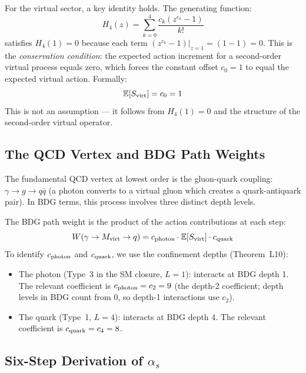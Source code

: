 \documentclass[12pt,a4paper]{article}
\begin{document}
For the virtual sector, a key identity holds.  The generating function:
\begin{equation}
  H_4(z) = \sum_{k=0}^{4}\frac{c_k(z^{c_k}-1)}{k!}
  \label{eq:H4}
\end{equation}
satisfies $H_4(1)=0$ because each term $(z^{c_k}-1)|_{z=1}=(1-1)=0$.  This is the \emph{conservation condition}: the expected action increment for a second-order virtual process equals zero, which forces the constant offset $c_0=1$ to equal the expected virtual action.  Formally:
\begin{equation}
  \mathbb{E}[S_{\rm virt}] = c_0 = 1
  \label{eq:Evirt}
\end{equation}
This is not an assumption --- it follows from $H_4(1)=0$ and the structure of the second-order virtual operator.

\subsection{The QCD Vertex and BDG Path Weights}

The fundamental QCD vertex at lowest order is the gluon-quark coupling: $\gamma\to g\to q\bar{q}$ (a photon converts to a virtual gluon which creates a quark-antiquark pair).  In BDG terms, this process involves three distinct depth levels.

The BDG path weight is the product of the action contributions at each step:
\begin{equation}
  W(\gamma\to M_{\rm virt}\to q) = c_{\rm photon}\cdot\mathbb{E}[S_{\rm virt}]\cdot c_{\rm quark}
  \label{eq:pathweight}
\end{equation}
To identify $c_{\rm photon}$ and $c_{\rm quark}$, we use the confinement depths (Theorem~L10):
\begin{itemize}
  \item The photon (Type~3 in the SM closure, $L=1$): interacts at BDG depth 1.  The relevant coefficient is $c_{\rm photon}=c_2=9$ (the depth-2 coefficient; depth levels in BDG count from 0, so depth-1 interactions use $c_2$).
  \item The quark (Type~1, $L=4$): interacts at BDG depth 4.  The relevant coefficient is $c_{\rm quark}=c_4=8$.
\end{itemize}

\subsection{Six-Step Derivation of $\alpha_s$}
\end{document}
